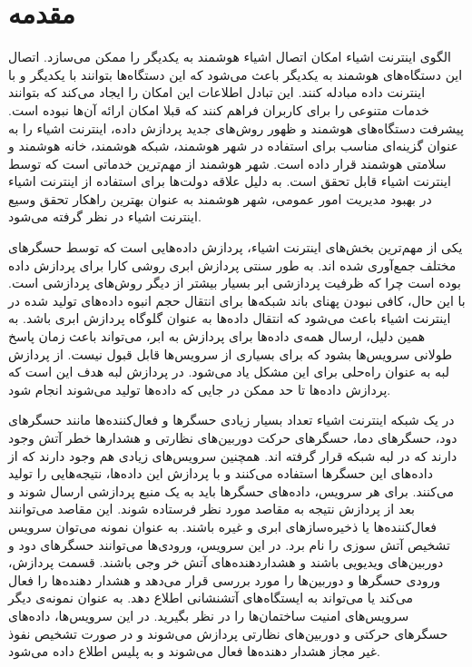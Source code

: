 
\chapter{مقدمه}
  \thispagestyle{empty}
    الگوی اینترنت اشیاء امکان اتصال اشیاء هوشمند به یکدیگر را ممکن می‌سازد.
    اتصال این دستگاه‌های هوشمند به یکدیگر باعث می‌شود که این دستگاه‌ها بتوانند با یکدیگر و با اینترنت داده مبادله کنند.
    این تبادل اطلاعات این امکان را ایجاد می‌کند که بتوانند خدمات متنوعی را برای کاربران فراهم کنند که قبلا امکان ارائه آن‌ها نبوده است.
    پیشرفت دستگاه‌های هوشمند و ظهور روش‌های جدید پردازش داده، اینترنت اشیاء را به عنوان گزینه‌ای مناسب برای استفاده در شهر هوشمند، شبکه هوشمند، خانه هوشمند و سلامتی هوشمند قرار داده است.
    شهر هوشمند از مهم‌ترین خدماتی است که توسط اینترنت اشیاء قابل تحقق است.
    به دلیل علاقه دولت‌‌ها برای استفاده از اینترنت اشیاء در بهبود مدیریت امور عمومی، شهر هوشمند به عنوان بهترین راهکار تحقق وسیع اینترنت اشیاء در نظر گرفته می‌شود.

    یکی از مهم‌ترین بخش‌های اینترنت اشیاء، پردازش داده‌هایی است که توسط حسگر‌های مختلف جمع‌آوری شده‌ اند.
    به طور سنتی پردازش ابری روشی کارا برای پردازش داده بوده است چرا که ظرفیت پردازشی ابر بسیار بیشتر از دیگر روش‌های پردازشی است.
    با این حال، کافی نبودن پهنای باند شبکه‌ها برای انتقال حجم انبوه داده‌های تولید شده در اینترنت اشیاء باعث می‌شود که انتقال داده‌ها به عنوان گلوگاه پردازش ابری باشد.
    به همین دلیل، ارسال همه‌ی داده‌ها برای پردازش به ابر، می‌تواند باعث زمان پاسخ طولانی سرویس‌ها بشود که برای بسیاری از سرویس‌ها قابل قبول نیست.
    از پردازش لبه به عنوان راه‌حلی برای این مشکل یاد می‌شود.
    در پردازش لبه هدف این است که پردازش داده‌ها تا حد ممکن در جایی که داده‌ها تولید می‌شوند انجام شود.

    در یک شبکه اینترنت اشیاء تعداد بسیار زیادی حسگر‌ها و فعال‌کننده‌ها مانند حسگر‌های دود، حسگر‌های دما، حسگر‌های حرکت دوربین‌های نظارتی و هشدار‌ها خطر آتش وجود دارند که در لبه شبکه قرار گرفته اند.
    همچنین سرویس‌های زیادی هم وجود دارند که از داده‌های این حسگر‌ها استفاده می‌کنند و با پردازش این داده‌ها، نتیجه‌هایی را تولید می‌کنند.
    برای هر سرویس، داده‌های حسگر‌ها باید به یک منبع پردازشی ارسال شوند و بعد از پردازش نتیجه به مقاصد مورد نظر فرستاده شوند.
    این مقاصد می‌توانند فعال‌کننده‌ها یا ذخیره‌سازهای ابری و غیره باشند.
    به عنوان نمونه می‌توان سرویس تشخیص آتش سوزی را نام برد.
    در این سرویس، ورودی‌ها می‌توانند حسگر‌های دود و دوربین‌های ویدیویی باشند و هشداردهنده‌‌های آتش خر وجی باشند.
    قسمت پردازش، ورودی حسگر‌ها و دوربین‌ها را مورد بررسی قرار می‌دهد و هشدار دهنده‌ها را فعال می‌کند یا می‌تواند به ایستگاه‌‌های آتشنشانی اطلاع دهد.
    به عنوان نمونه‌ی دیگر سرویس‌های امنیت ساختمان‌ها را در نظر بگیرید.
    در این سرویس‌ها، داده‌های حسگر‌های حرکتی و دوربین‌های نظارتی پردازش می‌شوند و در صورت تشخیص نفوذ غیر مجاز هشدار دهنده‌ها فعال می‌شوند و به پلیس اطلاع داده می‌شود.

